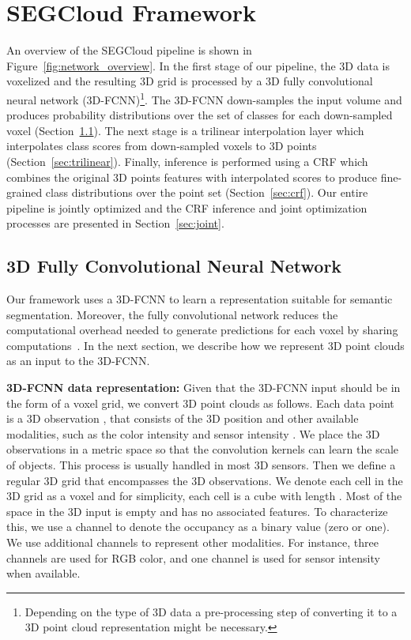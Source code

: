 \documentclass[10pt,twocolumn,letterpaper]{article}
\newcommand{\fccrf}[0]{CRF\xspace}
\newcommand{\ours}[0]{SEGCloud\xspace}
\newcommand{\threedfcnn}[0]{3D-FCNN\xspace}
\begin{document}
\section{\ours Framework} \label{sec:framework}
An overview of the \ours pipeline is shown in Figure~\ref{fig:network_overview}. In the first stage of our pipeline, the 3D data is voxelized and the resulting 3D grid is processed by a 3D fully convolutional neural network (\threedfcnn)\footnote{Depending on the type of 3D data a pre-processing step of converting it to a 3D point cloud representation might be necessary.}. The \threedfcnn down-samples the input volume and produces probability distributions over the set of classes for each down-sampled voxel (Section~\ref{sec:threedcnn}). The next stage is a trilinear interpolation layer which interpolates class scores from down-sampled voxels to 3D points (Section~\ref{sec:trilinear}). Finally, inference is performed using a \fccrf which combines the original 3D points features with interpolated scores to produce fine-grained class distributions over the point set (Section~\ref{sec:crf}). Our entire pipeline is jointly optimized and the \fccrf inference and joint optimization processes are presented in Section~\ref{sec:joint}.


\subsection{3D Fully Convolutional Neural Network} \label{sec:threedcnn}

Our framework uses a \threedfcnn to learn a representation suitable for semantic segmentation. Moreover, the fully convolutional network reduces the computational overhead needed to generate predictions for each voxel by sharing computations~\cite{Long2015}. In the next section, we describe how we represent 3D point clouds as an input to the \threedfcnn.

\noindent\textbf{\threedfcnn data representation: }Given that the  \threedfcnn input should be in the form of a voxel grid, we convert 3D point clouds as follows. Each data point is a 3D observation , that consists of the 3D position  and other available modalities, such as the color intensity  and sensor intensity . We place the 3D observations  in a metric space so that the convolution kernels can learn the scale of objects. This process is usually handled in most 3D sensors. Then we define a regular 3D grid that encompasses the 3D observations. We denote each cell in the 3D grid as a voxel  and for simplicity, each cell is a cube with length . Most of the space in the 3D input is empty and has no associated features. To characterize this, we use a channel to denote the occupancy as a binary value (zero or one). We use additional channels to represent other modalities. For instance, three channels are used for RGB color, and one channel is used for sensor intensity when available.
\end{document}
